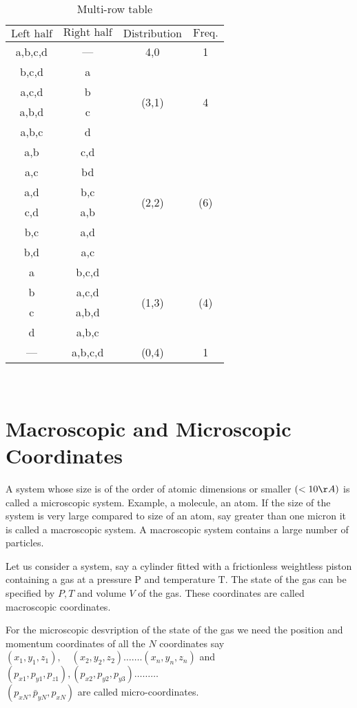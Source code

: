 	\begin{table}[ht]
	\caption{Multi-row table}
	\begin{center}
		\begin{tabular}{|c|c|c|c|}
			\hline
			$\text{Left half}$&$\text{Right half}$&$\text{Distribution}$&$\text{Freq.}$\\\hline
			a,b,c,d&---&4,0&1\\\hline
			b,c,d&a&\multirow{4}{*}{(3,1)}&\multirow{4}{*}{4}\\\cline{1-2}
			a,c,d&b & &\\\cline{1-2}
			a,b,d&c& &\\\cline{1-2}
			a,b,c&d& &\\\cline{1-2}\hline
			a,b&c,d&\multirow{6}{*}{(2,2)}&\multirow{6}{*}{(6)}\\\cline{1-2}
			a,c&bd& & \\\cline{1-2}
			a,d& b,c& & \\\cline{1-2}
			c,d&a,b& & \\\cline{1-2}
			b,c& a,d& & \\\cline{1-2}
			b,d&a,c& & \\\cline{1-2}\hline
			a&b,c,d&\multirow{4}{*}{(1,3)}&\multirow{4}{*}{(4)}\\\cline{1-2} 
			b&a,c,d& & \\\cline{1-2}
			c&a,b,d & &\\\cline{1-2}
			d&a,b,c & &\\\hline
			---&a,b,c,d &(0,4) &1 \\\hline
		\end{tabular}
	\end{center}
	\label{tab:multicol}
\end{table}\\
\section{Macroscopic and Microscopic Coordinates}
A system whose size is of the order of atomic dimensions or smaller $(<10 \AA)$ is called a microscopic system. Example, a molecule, an atom. If the size of the system is very large compared to size of an atom, say greater than one micron it is called a macroscopic system. A macroscopic system contains a large number of particles.\\
\par Let us consider a system, say a cylinder fitted with a frictionless weightless piston containing a gas at a pressure $\mathrm{P}$ and temperature $\mathrm{T}$. The state of the gas can be specified by $P, T$ and volume $V$ of the gas. These coordinates are called macroscopic coordinates.\\
\par For the microscopic desvription of the state of the gas we need the position and momentum coordinates of all the $N$ coordinates say $\left(x_{1}, y_{1}, z_{1}\right), \quad\left(x_{2}, y_{2}, z_{2}\right) \ldots \ldots .\left(x_{n}, y_{n}, z_{n}\right)$ and $\left(p_{x 1}, p_{y 1}, p_{z 1}\right),\left(p_{x 2}, p_{y 2}, p_{y 3}\right) \ldots \ldots \ldots$\\$\left(p_{x N}, \bar{p}_{y N}, p_{x N}\right)$ are called micro-coordinates.

